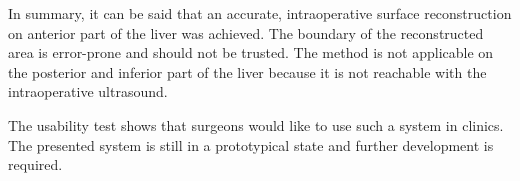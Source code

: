 

In summary, it can be said that an accurate, intraoperative surface reconstruction on anterior
part of the liver was achieved. The boundary of the reconstructed area is
error-prone and should not be trusted. The method is not applicable on the posterior
and inferior part of the liver because it is not reachable with the
intraoperative ultrasound.

The usability test shows that surgeons would like to
use such a system in clinics. The presented system is still in a prototypical state
and further development is required.


\endinput
